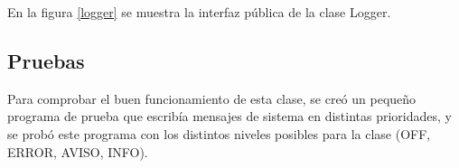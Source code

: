 En la figura \ref{logger} se muestra la interfaz pública de la clase Logger.\\


\subsection{Pruebas}

Para comprobar el buen funcionamiento de esta clase, se creó un pequeño programa de prueba que escribía mensajes de sistema en distintas prioridades, y se probó este programa con los distintos niveles posibles para la clase (OFF, ERROR, AVISO, INFO).

